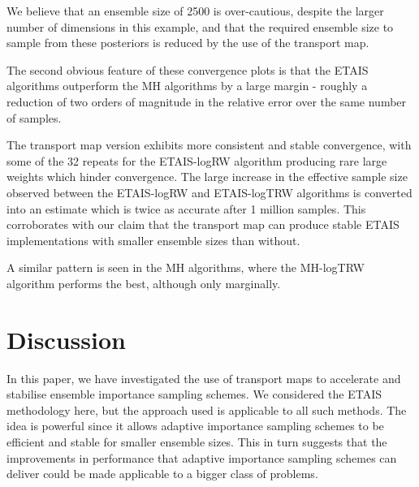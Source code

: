\documentclass[final]{siamltex}
\newcommand{\edit}[1]{#1}
\begin{document}
We believe that an ensemble size of 2500
is over-cautious, despite the larger number of dimensions in this
example, and that the required ensemble size to sample
from these posteriors is reduced by the use of the transport map.

The second obvious feature of these convergence plots is that the ETAIS
algorithms outperform the MH algorithms by a large margin - roughly a
reduction of two orders of magnitude in the relative error over the
same number of samples.


\edit{The transport map version exhibits more
consistent and stable convergence, with some of the 32 repeats for the
ETAIS-logRW algorithm producing rare large weights which hinder convergence.}
The large increase in the effective sample size
observed between the ETAIS-logRW and ETAIS-logTRW algorithms is
converted into an estimate which is twice as accurate after 1 million
samples. This corroborates with our claim that the transport map can
produce stable ETAIS implementations with smaller ensemble sizes than without.

\edit{A similar pattern is seen in the MH algorithms, where the MH-logTRW algorithm performs the best,
although only marginally. }

\section{Discussion}\label{sec:conc}
In this paper, we have investigated the use of transport maps to
accelerate and stabilise ensemble importance sampling schemes. We
considered the ETAIS methodology here, but the approach used is
applicable to all such methods. The idea is powerful since it allows
adaptive importance sampling schemes to be efficient and stable for
smaller ensemble sizes. This in turn suggests that the improvements in
performance that adaptive importance sampling schemes can deliver
could be made applicable to a bigger class of problems.
\end{document}
